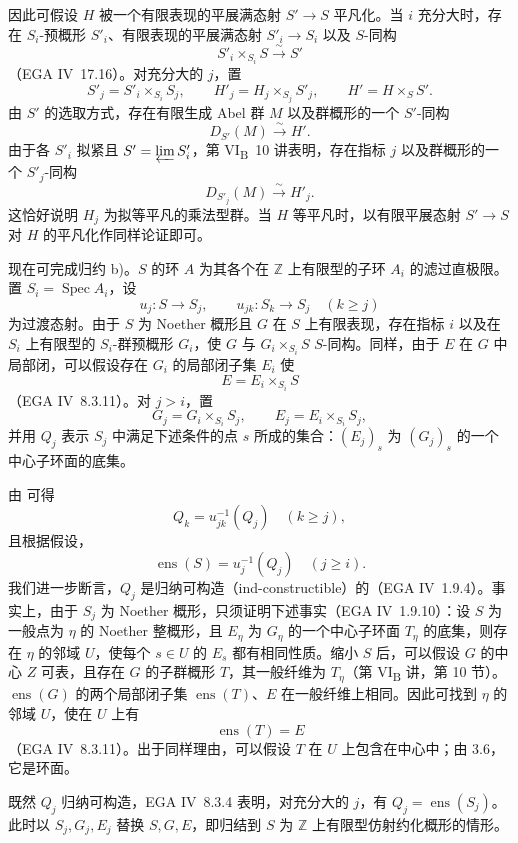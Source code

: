 因此可假设 \(H\) 被一个有限表现的平展满态射 \(S'\to S\) 平凡化。当 \(i\) 充分大时，存在 \(S_i\)-预概形 \(S'_i\)、有限表现的平展满态射 \(S'_i\to S_i\) 以及 \(S\)-同构
\[
  S'_i\times_{S_i}S\xrightarrow{\sim}S'
\]
（EGA IV~17.16）。对充分大的 \(j\)，置
\[
  S'_j=S'_i\times_{S_i}S_j,\qquad
  H'_j=H_j\times_{S_j}S'_j,\qquad
  H'=H\times_S S'.
\]
由 \(S'\) 的选取方式，存在有限生成 Abel 群 \(M\) 以及群概形的一个 \(S'\)-同构
\[
  D_{S'}(M)\xrightarrow{\sim}H'.
\]
由于各 \(S'_i\) 拟紧且 \(S'=\varprojlim S'_i\)，第 VI\textsubscript{B}~10 讲表明，存在指标 \(j\) 以及群概形的一个 \(S'_j\)-同构
\[
  D_{S'_j}(M)\xrightarrow{\sim}H'_j.
\]
这恰好说明 \(H_j\) 为拟等平凡的乘法型群。当 \(H\) 等平凡时，以有限平展态射 \(S'\to S\) 对 \(H\) 的平凡化作同样论证即可。

现在可完成归约 b)。\(S\) 的环 \(A\) 为其各个在 \(\mathbb Z\) 上有限型的子环 \(A_i\) 的滤过直极限。置 \(S_i=\operatorname{Spec}A_i\)，设
\[
  u_j:S\longrightarrow S_j,\qquad
  u_{jk}:S_k\longrightarrow S_j\quad(k\geq j)
\]
为过渡态射。由于 \(S\) 为 Noether 概形且 \(G\) 在 \(S\) 上有限表现，存在指标 \(i\) 以及在 \(S_i\) 上有限型的 \(S_i\)-群预概形 \(G_i\)，使 \(G\) 与 \(G_i\times_{S_i}S\) \(S\)-同构。同样，由于 \(E\) 在 \(G\) 中局部闭，可以假设存在 \(G_i\) 的局部闭子集 \(E_i\) 使
\[
  E=E_i\times_{S_i}S
\]
（EGA IV~8.3.11）。对 \(j>i\)，置
\[
  G_j=G_i\times_{S_i}S_j,\qquad
  E_j=E_i\times_{S_i}S_j,
\]
并用 \(Q_j\) 表示 \(S_j\) 中满足下述条件的点 \(s\) 所成的集合：\((E_j)_s\) 为 \((G_j)_s\) 的一个中心子环面的底集。

由  可得
\[
  Q_k=u_{jk}^{-1}(Q_j)\quad(k\geq j),
\]
且根据假设，
\[
  \operatorname{ens}(S)=u_j^{-1}(Q_j)\quad(j\geq i).
\]
我们进一步断言，\(Q_j\) 是归纳可构造（ind-constructible）的（EGA IV~1.9.4）。事实上，由于 \(S_j\) 为 Noether 概形，只须证明下述事实（EGA IV~1.9.10）：设 \(S\) 为一般点为 \(\eta\) 的 Noether 整概形，且 \(E_\eta\) 为 \(G_\eta\) 的一个中心子环面 \(T_\eta\) 的底集，则存在 \(\eta\) 的邻域 \(U\)，使每个 \(s\in U\) 的 \(E_s\) 都有相同性质。缩小 \(S\) 后，可以假设 \(G\) 的中心 \(Z\) 可表，且存在 \(G\) 的子群概形 \(T\)，其一般纤维为 \(T_\eta\)（第 VI\textsubscript{B} 讲，第 10 节）。\(\operatorname{ens}(G)\) 的两个局部闭子集 \(\operatorname{ens}(T)\)、\(E\) 在一般纤维上相同。因此可找到 \(\eta\) 的邻域 \(U\)，使在 \(U\) 上有
\[
  \operatorname{ens}(T)=E
\]
（EGA IV~8.3.11）。出于同样理由，可以假设 \(T\) 在 \(U\) 上包含在中心中；由 3.6，它是环面。

既然 \(Q_j\) 归纳可构造，EGA IV~8.3.4 表明，对充分大的 \(j\)，有 \(Q_j=\operatorname{ens}(S_j)\)。此时以 \(S_j,G_j,E_j\) 替换 \(S,G,E\)，即归结到 \(S\) 为 \(\mathbb Z\) 上有限型仿射约化概形的情形。

